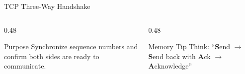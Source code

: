 \documentclass[aspectratio=169]{beamer}  %
\begin{document}
\begin{frame}{TCP Three-Way Handshake}
    \vspace{0.3em}
    \begin{columns}[T]
        \begin{column}{0.48\textwidth}
            \begin{block}{Purpose}
                \small
                Synchronize sequence numbers and confirm both sides are ready to communicate.
            \end{block}
        \end{column}
        \begin{column}{0.48\textwidth}
            \begin{exampleblock}{Memory Tip}
                \small
                Think: ``\textbf{S}end $\rightarrow$ \textbf{S}end back with \textbf{A}ck $\rightarrow$ \textbf{A}cknowledge''
            \end{exampleblock}
        \end{column}
    \end{columns}
\end{frame}
\end{document}
